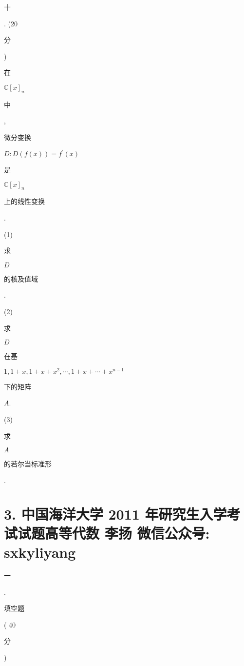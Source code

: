 \documentclass[10pt]{article}
\begin{document}
\begin{CJK}{UTF8}{mj}十\end{CJK}. (20 \begin{CJK}{UTF8}{mj}分\end{CJK}) \begin{CJK}{UTF8}{mj}在\end{CJK} $\mathbb{C}[x]_{n}$ \begin{CJK}{UTF8}{mj}中\end{CJK}, \begin{CJK}{UTF8}{mj}微分变换\end{CJK} $D: D(f(x))=f^{\prime}(x)$ \begin{CJK}{UTF8}{mj}是\end{CJK} $\mathbb{C}[x]_{n}$ \begin{CJK}{UTF8}{mj}上的线性变换\end{CJK}.

(1) \begin{CJK}{UTF8}{mj}求\end{CJK} $D$ \begin{CJK}{UTF8}{mj}的核及值域\end{CJK}.

(2) \begin{CJK}{UTF8}{mj}求\end{CJK} $D$ \begin{CJK}{UTF8}{mj}在基\end{CJK} $1,1+x, 1+x+x^{2}, \cdots, 1+x+\cdots+x^{n-1}$ \begin{CJK}{UTF8}{mj}下的矩阵\end{CJK} $A$.

(3) \begin{CJK}{UTF8}{mj}求\end{CJK} $A$ \begin{CJK}{UTF8}{mj}的若尔当标准形\end{CJK}.

\section{3. 中国海洋大学 2011 年研究生入学考试试题高等代数 
 李扬 
 微信公众号: sxkyliyang}
\begin{CJK}{UTF8}{mj}一\end{CJK}. \begin{CJK}{UTF8}{mj}填空题\end{CJK} ( 40 \begin{CJK}{UTF8}{mj}分\end{CJK})
\end{document}
